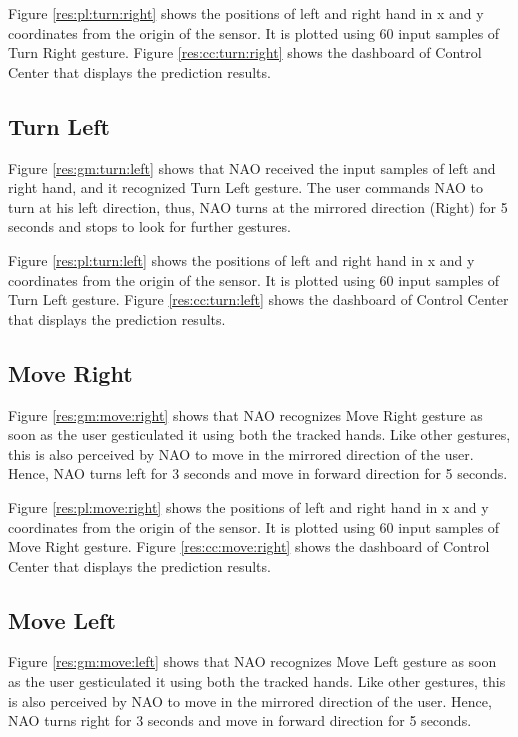 

Figure \ref{res:pl:turn:right} shows the positions of left and right hand in x and y coordinates from the origin of the sensor. It is plotted using 60 input samples of Turn Right gesture. Figure \ref{res:cc:turn:right} shows the dashboard of Control Center that displays the prediction results. 

\clearpage 
\subsection{Turn Left} Figure \ref{res:gm:turn:left} shows that NAO received the input samples of left and right hand, and it recognized Turn Left gesture. The user commands NAO to turn at his left direction, thus, NAO turns at the mirrored direction (Right) for 5 seconds and stops to look for further gestures.



Figure \ref{res:pl:turn:left} shows the positions of left and right hand in x and y coordinates from the origin of the sensor. It is plotted using 60 input samples of Turn Left gesture. Figure \ref{res:cc:turn:left} shows the dashboard of Control Center that displays the prediction results. 

\clearpage 
\subsection{Move Right} Figure \ref{res:gm:move:right} shows that NAO recognizes Move Right gesture as soon as the user gesticulated it using both the tracked hands. Like other gestures, this is also perceived by NAO to move in the mirrored direction of the user. Hence, NAO turns left for 3 seconds and move in forward direction for 5 seconds.



Figure \ref{res:pl:move:right} shows the positions of left and right hand in x and y coordinates from the origin of the sensor. It is plotted using 60 input samples of Move Right gesture. Figure \ref{res:cc:move:right} shows the dashboard of Control Center that displays the prediction results. 

\clearpage 
\subsection{Move Left} Figure \ref{res:gm:move:left} shows that NAO recognizes Move Left gesture as soon as the user gesticulated it using both the tracked hands. Like other gestures, this is also perceived by NAO to move in the mirrored direction of the user. Hence, NAO turns right for 3 seconds and move in forward direction for 5 seconds.

